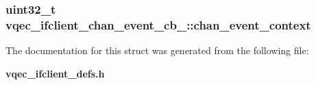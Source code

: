\subsubsection{\setlength{\rightskip}{0pt plus 5cm}uint32\_\-t \bf{vqec\_\-ifclient\_\-chan\_\-event\_\-cb\_\-::chan\_\-event\_\-context}}\label{structvqec__ifclient__chan__event__cb___feaa960409cecdcff526be91fec24c4d}




The documentation for this struct was generated from the following file:\begin{CompactItemize}
\item 
\bf{vqec\_\-ifclient\_\-defs.h}\end{CompactItemize}
